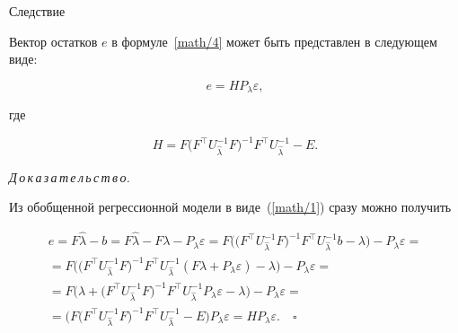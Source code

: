 \smallskip



\begin{newthm}{Следствие}

    Вектор остатков $e$ в формуле~\eqref{math/4} может быть представлен в следующем виде:

    \begin{equation*}


        e=HP_{\lambda}\varepsilon, 

    \end{equation*}

где

    \begin{equation}

        \label{math/17}

        H=F\bigl( F^{\top}U^{-1}_{\hat{\lambda}}F \bigr) ^{-1}F^{\top}U^{-1}_{\hat{\lambda}}-E.

    \end{equation}

\end{newthm}



{\it Д\,о\,к\,а\,з\,а\,т\,е\,л\,ь\,с\,т\,в\,о.}

    Из обобщенной регрессионной модели в виде~(\ref{math/1}) сразу можно получить

\begin{multline*}

e=F\hat{\lambda}-b=F\hat{\lambda}-F\lambda-P_{\lambda}\varepsilon=

F\bigl( \bigl( F^{\top}U^{-1}_{\hat{\lambda}}F \bigr) ^{-1}F^{\top}U^{-1}_{\hat{\lambda}}b-\lambda \bigr) -P_{\lambda}\varepsilon= \\

=

    F\bigl( \bigl( F^{\top}U^{-1}_{\hat{\lambda}}F \bigr) ^{-1}F^{\top}U^{-1}_{\hat{\lambda}}( F\lambda+P_{\lambda}\varepsilon ) -\lambda \bigr) -P_{\lambda}\varepsilon= \\

    =

    F\bigl( \lambda+ \bigl( F^{\top}U^{-1}_{\hat{\lambda}}F \bigr) ^{-1}F^{\top}U^{-1}_{\hat{\lambda}}P_{\lambda}\varepsilon-\lambda \bigr) -P_{\lambda}\varepsilon= \\

    =

    \bigl( F\bigl( F^{\top}U^{-1}_{\hat{\lambda}}F \bigr) ^{-1}F^{\top}U^{-1}_{\hat{\lambda}}-E \bigr) P_{\lambda}\varepsilon=HP_{\lambda}\varepsilon. \quad \square

\end{multline*}





